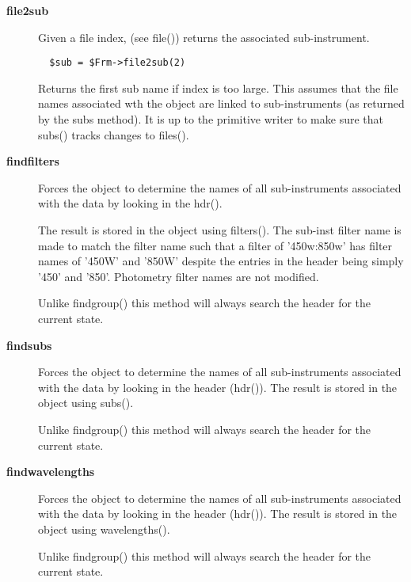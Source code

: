 \begin{description}

\item[{\textbf{file2sub}}] \mbox{}

Given a file index, (see file()) returns the associated
sub-instrument.

\begin{verbatim}
  $sub = $Frm->file2sub(2)
\end{verbatim}


Returns the first sub name if index is too large.
This assumes that the file names associated wth the
object are linked to sub-instruments (as returned
by the subs method). It is up to the primitive writer
to make sure that subs() tracks changes to files().


\item[{\textbf{findfilters}}] \mbox{}

Forces the object to determine the names of all sub-instruments
associated with the data by looking in the hdr().



The result is stored in the object using filters(). The sub-inst filter
name is made to match the filter name such that a filter of '450w:850w'
has filter names of '450W' and '850W' despite the entries in the header
being simply '450' and '850'. Photometry filter names are not modified.



Unlike findgroup() this method will always search the header for
the current state.


\item[{\textbf{findsubs}}] \mbox{}

Forces the object to determine the names of all sub-instruments
associated with the data by looking in the header (hdr()).
The result is stored in the object using subs().



Unlike findgroup() this method will always search the header for
the current state.


\item[{\textbf{findwavelengths}}] \mbox{}

Forces the object to determine the names of all sub-instruments
associated with the data by looking in the header (hdr()).
The result is stored in the object using wavelengths().



Unlike findgroup() this method will always search the header for
the current state.



\end{description}
